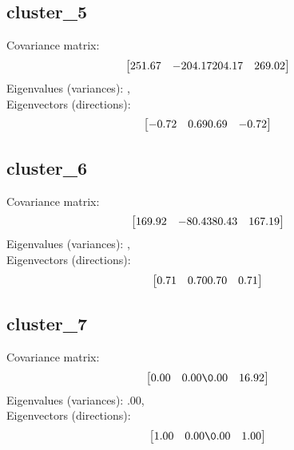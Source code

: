 \documentclass{article}
\begin{document}
\subsection*{cluster_5}
Covariance matrix:
\[\begin{bmatrix}251.67 & -204.17 \-204.17 & 269.02\end{bmatrix}\]
Eigenvalues (variances): , \\
Eigenvectors (directions):
\[\begin{bmatrix}-0.72 & 0.69 \-0.69 & -0.72\end{bmatrix}\]
\subsection*{cluster_6}
Covariance matrix:
\[\begin{bmatrix}169.92 & -80.43 \-80.43 & 167.19\end{bmatrix}\]
Eigenvalues (variances): , \\
Eigenvectors (directions):
\[\begin{bmatrix}0.71 & 0.70 \-0.70 & 0.71\end{bmatrix}\]
\subsection*{cluster_7}
Covariance matrix:
\[\begin{bmatrix}0.00 & 0.00 \0.00 & 16.92\end{bmatrix}\]
Eigenvalues (variances): \0.00, \\
Eigenvectors (directions):
\[\begin{bmatrix}1.00 & 0.00 \0.00 & 1.00\end{bmatrix}\]
\end{document}
